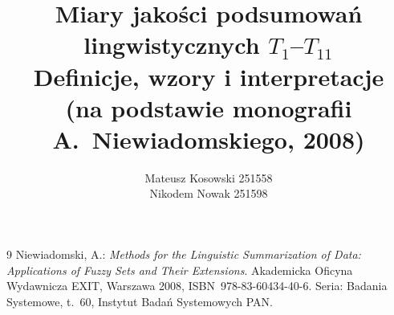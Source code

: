 \documentclass[11pt,a4paper]{article}
\title{Miary jakości podsumowań lingwistycznych $T_1$--$T_{11}$ \\
\large Definicje, wzory i interpretacje\\
(na podstawie monografii A.~Niewiadomskiego, 2008)}
\author{Mateusz Kosowski 251558 \\ Nikodem Nowak 251598}
\date{}
\begin{document}
\maketitle



\begin{thebibliography}{9}
Niewiadomski, A.: \textit{Methods for the Linguistic Summarization
of Data: Applications of Fuzzy Sets and Their Extensions}.
Akademicka Oficyna Wydawnicza EXIT, Warszawa 2008,
ISBN~978-83-60434-40-6. Seria: Badania Systemowe, t.~60,
Instytut Badań Systemowych PAN.
\end{thebibliography}
\end{document}
